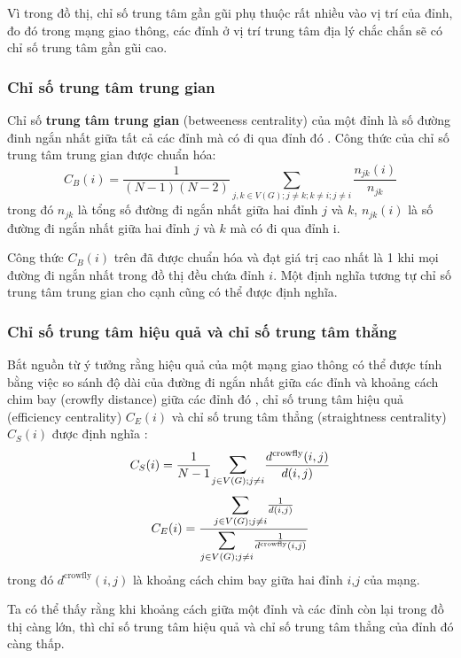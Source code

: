 \documentclass[14pt, oneside, a4paper, openany]{scrartcl}
\begin{document}
Vì trong đồ thị, chỉ số trung tâm gần gũi phụ thuộc rất nhiều vào vị trí của đỉnh, đo đó trong mạng giao thông, các đỉnh ở vị trí trung tâm địa lý chắc chắn sẽ có chỉ số trung tâm gần gũi cao.
\subsubsection{Chỉ số trung tâm trung gian}
Chỉ số \textbf{trung tâm trung gian}  (betweeness centrality) của một đỉnh là số đường đinh ngắn nhất giữa tất cả các đỉnh mà có đi qua đỉnh đó \cite{centrali02}. Công thức của chỉ số trung tâm trung gian được chuẩn hóa:
\begin{equation}
C_B(i) = \frac{1}{(N-1)(N-2)} \sum_{j,k \in V(G); j \neq k; k\neq i; j \neq i} \frac{n_{jk}(i)}{n_{jk}}
\end{equation}
trong đó $n_{jk}$ là tổng số đường đi ngắn nhất giữa hai đỉnh $j$ và $k$, $n_{jk}(i)$ là số đường đi ngắn nhất giữa hai đỉnh $j$ và $k$ mà có đi qua đỉnh i.

Công thức $C_B(i)$ trên đã được chuẩn hóa và đạt giá trị cao nhất là 1 khi mọi đường đi ngắn nhất trong đồ thị đều chứa đỉnh $i$. Một định nghĩa tương tự chỉ số trung tâm trung gian cho cạnh cũng có thể được định nghĩa.

\subsubsection{Chỉ số trung tâm hiệu quả và chỉ số trung tâm thẳng}
Bắt nguồn từ ý tưởng rằng hiệu quả của một mạng giao thông có thể được tính bằng việc so sánh độ dài của đường đi ngắn nhất giữa các đỉnh và khoảng cách chim bay (crowfly distance) giữa các đỉnh đó \cite{efficiency01}, chỉ số trung tâm hiệu quả (efficiency centrality) $C_E(i)$ và chỉ số trung tâm thẳng (straightness centrality) $C_S(i)$ được định nghĩa \cite{efficiency02}:
\begin{equation}
C_S(i) = \frac{1}{N-1} \mathlarger{\sum}_{j \in V(G); j \neq i} \frac{d^{\text{crowfly}}(i,j)}{d(i,j)}
\end{equation}
\begin{equation}
C_E(i) = \frac{\mathlarger{\sum}_{j \in V(G); j \neq i}\frac{1}{d(i,j)}}{\mathlarger{\sum}_{j \in V(G); j \neq i}\frac{1}{d^{\text{crowfly}}(i,j)}}
\end{equation}
trong đó $d^{\text{crowfly}}(i,j)$ là khoảng cách chim bay giữa hai đỉnh $i$,$j$ của mạng.

Ta có thể thấy rằng khi khoảng cách giữa một đỉnh và các đỉnh còn lại trong đồ thị càng lớn, thì chỉ số trung tâm hiệu quả và chỉ số trung tâm thẳng của đỉnh đó càng thấp.
\newpage
{}
\end{document}
